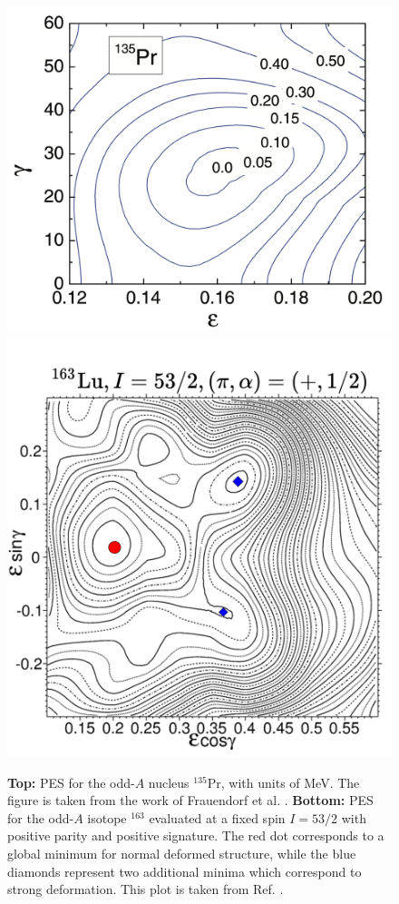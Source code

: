 \begin{figure}
    \centering
    \includegraphics[scale=0.17]{Chapters/Figures/135Pr-PES.pdf}
    \includegraphics[scale=0.38]{Chapters/Figures/163Lu-PES.pdf}
    \caption{\textbf{Top:} PES for the odd-$A$ nucleus $^{135}$Pr, with units of MeV. The figure is taken from the work of Frauendorf et al. \cite{frauendorf2014transverse}. \textbf{Bottom:} PES for the odd-$A$ isotope $^{163}$ evaluated at a fixed spin $I=53/2$ with positive parity and positive signature. The red dot corresponds to a global minimum for normal deformed structure, while the blue diamonds represent two additional minima which correspond to strong deformation. This plot is taken from Ref. \cite{jensen2002wobbling}.}
    \label{pes-example-set-2}
\end{figure}

